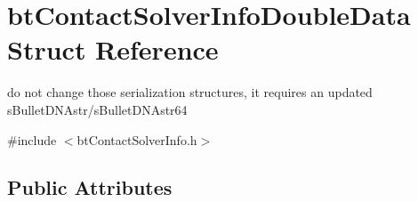 \hypertarget{structbtContactSolverInfoDoubleData}{}\section{bt\+Contact\+Solver\+Info\+Double\+Data Struct Reference}
\label{structbtContactSolverInfoDoubleData}


do not change those serialization structures, it requires an updated s\+Bullet\+D\+N\+Astr/s\+Bullet\+D\+N\+Astr64  




{\ttfamily \#include $<$bt\+Contact\+Solver\+Info.\+h$>$}

\subsection*{Public Attributes}

